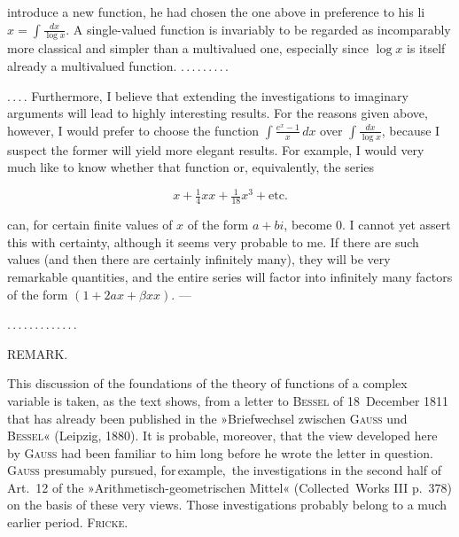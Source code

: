 %
introduce a new function, he had chosen the one above in preference to his li~$x = \int \frac{dx}{\log x}$. A
single-valued function is invariably to be regarded as incomparably more classical and simpler than
a multivalued one, especially since $\log x$ is itself already a multivalued function. $\mathord{.}\,\mathord{.}\,\mathord{.}\,\mathord{.}\,\mathord{.}\,\mathord{.}\,\mathord{.}\,\mathord{.}\,\mathord{.}$

$\mathord{.}\,\mathord{.}\,\mathord{.}\,\mathord{.}$ Furthermore, I believe that extending the investigations to imaginary
arguments will lead to highly interesting results. For the reasons given above, however, I would
prefer to choose the function $\int \frac{e^x-1}{x}\,dx$ over
$\int \frac{dx}{\log x}$, because I suspect the former will yield more elegant results.
For example, I would very much like to know whether that function or, equivalently,
the series

\[
x + \tfrac14 xx + \tfrac{1}{18}x^3 + \text{etc.}
\]

\noindent can, for certain finite values of $x$ of the form $a+bi$, become $0$. I
cannot yet assert this with certainty, although it seems very probable to me. If there are
such values (and then there are certainly infinitely many), they will be very remarkable quantities,
and the entire series will factor into infinitely many factors of the form $(1+2ax+\beta xx)$.
---

$\mathord{.}\,\mathord{.}\,\mathord{.}\,\mathord{.}\,\mathord{.}\,\mathord{.}\,\mathord{.}\,\mathord{.}\,\mathord{.}\,\mathord{.}\,\mathord{.}\,\mathord{.}\,\mathord{.}$

\begin{center}
REMARK.
\end{center}

\noindent\hspace*{\parindent}This discussion of the foundations of the theory of functions of a complex variable
is taken, as the text shows, from a letter to \textsc{Bessel} of 18\ December 1811
that has already been published in the »Briefwechsel zwischen \textsc{Gauss} und \textsc{Bessel}«
(Leipzig, 1880). It is probable, moreover, that the view
developed here by \textsc{Gauss} had been familiar to him long before he wrote the
letter in question. \textsc{Gauss} presumably pursued, for\,example,\ the investigations in the
second half of
Art.\ 12 of the »Arithmetisch-geometrischen Mittel« (Collected\ Works III p.\ 378) on the basis of these very views.
Those investigations probably belong to a much earlier period. \hfill \textsc{Fricke}.
